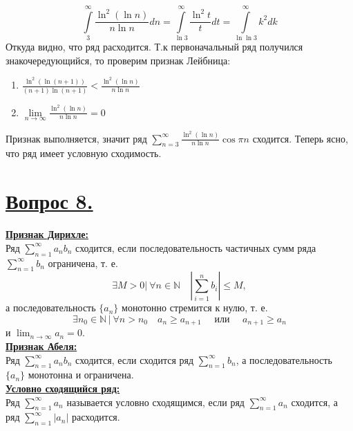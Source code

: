 \documentclass{report}
\begin{document}
$$\int\limits_3^\infty \frac{\ln^2{(\ln{n})}}{n \ln{n}} dn = \int\limits_{\ln{3}}^\infty \frac{\ln^2{t}}{t} dt = \int\limits_{\ln{\ln{3}}}^\infty k^2 dk$$
Откуда видно, что ряд расходится. Т.к первоначальный ряд получился знакочередующийся, то проверим признак Лейбница:
\begin{enumerate}
\item $\frac{\ln^2{(\ln{(n + 1)})}}{(n + 1) \ln{(n + 1)}} < \frac{\ln^2{(\ln{n})}}{n \ln{n}}$
\item $\lim\limits_{n \to \infty} \frac{\ln^2{(\ln{n})}}{n \ln{n}} = 0$
\end{enumerate}
Признак выполняется, значит ряд $\sum\limits_{n = 3}^\infty \frac{\ln^2{(\ln{n})}}{n \ln{n}} \cos{\pi n}$ сходится. Теперь ясно, что ряд имеет условную сходимость.
\newpage

\section{\underline{Вопрос 8.}}

\textbf{\underline{Признак Дирихле:}} \\
    Ряд \( \sum_{n = 1}^{\infty} a_n b_n \) сходится, если последовательность частичных сумм ряда \( \sum_{n = 1}^{\infty} b_n \) ограничена, т. е.
    \begin{equation}
        \exists M > 0\vert\ \forall n \in \mathbb{N}\quad \left| \sum_{i = 1}^{n}b_i \right| \leq M,
    \end{equation}
    а последовательность \( \{a_n\} \) монотонно стремится к нулю, т. е. 
    \begin{equation*}
        \exists n_0 \in \mathbb{N}\, \vert\ \forall n > n_0 \quad a_n \geq a_{n + 1} \quad \text{ или  }  \quad a_{n + 1} \geq a_{n}
    \end{equation*}
     и \( \lim_{n \rightarrow \infty} a_n = 0 \).
\\

\textbf{\underline{Признак Абеля:}} \\
    Ряд \( \sum_{n = 1}^{\infty} a_n b_n \) сходится, если сходится ряд \( \sum_{n = 1}^{\infty} b_n \), а последовательность \( \{a_n\} \) монотонна и ограничена.
\\

\textbf{\underline{Условно сходящийся ряд:}} \\
    Ряд \( \sum_{n = 1}^{\infty} a_n \) называется условно сходящимся, если ряд \( \sum_{n = 1}^{\infty} a_n \) сходится, а ряд \( \sum_{n = 1}^{\infty} \left| a_n \right| \) расходится.
\\
\end{document}
